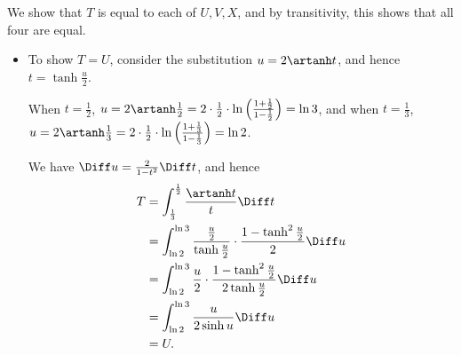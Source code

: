 \Question{\currfilebase}

We show that \(T\) is equal to each of \(U, V, X\), and by transitivity, this shows that all four are equal.

\begin{itemize}
    \item To show \(T = U\), consider the substitution \(u = 2 \artanh t\), and hence \(t = \tanh \frac{u}{2}\).

          When \(t = \frac{1}{2}\), \(u = 2 \artanh \frac{1}{2} = 2 \cdot \frac{1}{2} \cdot \ln \left(\frac{1 + \frac{1}{2}}{1 - \frac{1}{2}}\right) = \ln 3\), and when \(t = \frac{1}{3}\), \(u = 2 \artanh \frac{1}{3} = 2 \cdot \frac{1}{2} \cdot \ln \left(\frac{1 + \frac{1}{3}}{1 - \frac{1}{3}}\right) = \ln 2\).

          We have \(\Diff u = \frac{2}{1 - t^2} \Diff t\), and hence
          \begin{align*}
              T & = \int_{\frac{1}{3}}^{\frac{1}{2}} \frac{\artanh t}{t} \Diff t                                               \\
                & = \int_{\ln 2}^{\ln 3} \frac{\frac{u}{2}}{\tanh \frac{u}{2}} \cdot \frac{1 - \tanh^2 \frac{u}{2}}{2} \Diff u \\
                & = \int_{\ln 2}^{\ln 3} \frac{u}{2} \cdot \frac{1 - \tanh^2 \frac{u}{2}}{2 \tanh \frac{u}{2}} \Diff u         \\
                & = \int_{\ln 2}^{\ln 3} \frac{u}{2 \sinh u} \Diff u                                                           \\
                & = U.
          \end{align*}


\end{itemize}
